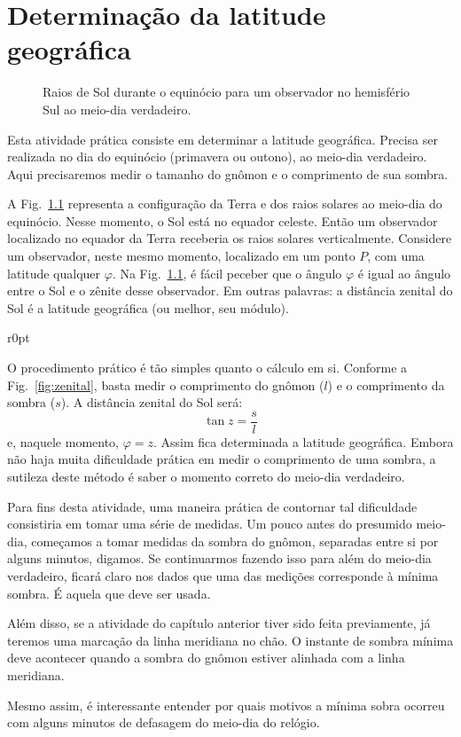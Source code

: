 \chapter{Determinação da latitude geográfica}

\begin{figure}[ht]
\centering

\caption{Raios de Sol durante o equinócio para um observador no hemisfério Sul ao meio-dia verdadeiro.}
\label{fig:equinocios}
\end{figure}

Esta atividade prática consiste em determinar a latitude geográfica. Precisa ser realizada no dia do equinócio (primavera ou outono), ao meio-dia verdadeiro. Aqui precisaremos medir o tamanho do gnômon e o comprimento de sua sombra.

A Fig.~\ref{fig:equinocios} representa a configuração da Terra e dos raios solares ao meio-dia do equinócio. Nesse momento, o Sol está no equador celeste. Então um observador localizado no equador da Terra receberia os raios solares verticalmente. Considere um observador, neste mesmo momento, localizado em um ponto $P$, com uma latitude qualquer $\varphi$. Na Fig.~\ref{fig:equinocios}, é fácil peceber que o ângulo $\varphi$ é igual ao ângulo entre o Sol e o zênite desse observador. Em outras palavras: a distância zenital do Sol é a latitude geográfica (ou melhor, seu módulo).

\begin{wrapfigure}[18]{r}{0pt}

\caption{Distância zenital do Sol.}
\label{fig:zenital}
\end{wrapfigure}

O procedimento prático é tão simples quanto o cálculo em si. Conforme a Fig.~\ref{fig:zenital}, basta medir o comprimento do gnômon ($l$) e o comprimento da sombra ($s$). A distância zenital do Sol será:
%
\begin{equation}
\tan z = \frac{s}{l}
\end{equation}
%
e, naquele momento, $\varphi = z$. Assim fica determinada a latitude geográfica. Embora não haja muita dificuldade prática em medir o comprimento de uma sombra, a sutileza deste método é saber o momento correto do meio-dia verdadeiro.

Para fins desta atividade, uma maneira prática de contornar tal dificuldade consistiria em tomar uma série de medidas. Um pouco antes do presumido meio-dia, começamos a tomar medidas da sombra do gnômon, separadas entre si por alguns minutos, digamos. Se continuarmos fazendo isso para além do meio-dia verdadeiro, ficará claro nos dados que uma das medições corresponde à mínima sombra. É aquela que deve ser usada.

Além disso, se a atividade do capítulo anterior tiver sido feita previamente, já teremos uma marcação da linha meridiana no chão. O instante de sombra mínima deve acontecer quando a sombra do gnômon estiver alinhada com a linha meridiana.

Mesmo assim, é interessante entender por quais motivos a mínima sobra ocorreu com alguns minutos de defasagem do meio-dia do relógio.




